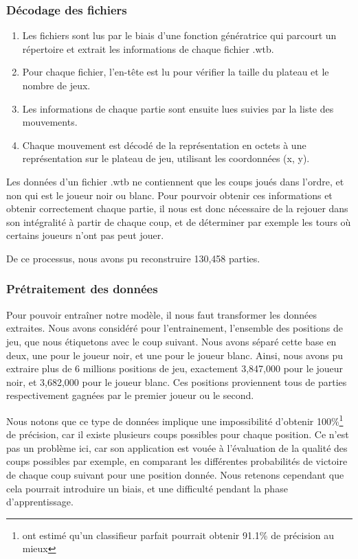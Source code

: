 \subsubsection{Décodage des fichiers}
\begin{enumerate}
    \item Les fichiers sont lus par le biais d'une fonction génératrice qui parcourt un répertoire et extrait les informations de chaque fichier .wtb.
    \item Pour chaque fichier, l'en-tête est lu pour vérifier la taille du plateau et le nombre de jeux.
    \item Les informations de chaque partie sont ensuite lues suivies par la liste des mouvements.
    \item Chaque mouvement est décodé de la représentation en octets à une représentation sur le plateau de jeu, utilisant les coordonnées (x, y).
\end{enumerate}

Les données d'un fichier .wtb ne contiennent que les coups joués dans l'ordre, et non qui est le joueur noir ou blanc. Pour pourvoir obtenir ces informations et obtenir correctement chaque partie, il nous est donc nécessaire de la rejouer dans son intégralité à partir de chaque coup, et de déterminer par exemple les tours où certains joueurs n'ont pas peut jouer.

De ce processus, nous avons pu reconstruire 130,458 parties.

\subsubsection{Prétraitement des données}
\label{subsubsec:preproc}
Pour pouvoir entraîner notre modèle, il nous faut transformer les données extraites. Nous avons considéré pour l'entrainement, l'ensemble des positions de jeu, que nous étiquetons avec le coup suivant. Nous avons séparé cette base en deux, une pour le joueur noir, et une pour le joueur blanc. Ainsi, nous avons pu extraire plus de 6 millions positions de jeu, exactement 3,847,000 pour le joueur noir, et 3,682,000 pour le joueur blanc. Ces positions proviennent tous de parties respectivement gagnées par le premier joueur ou le second. 

Nous notons que ce type de données implique une impossibilité d'obtenir 100\%\footnote{\cite{Liskowski_2018} ont estimé qu'un classifieur parfait pourrait obtenir 91.1\% de précision au mieux} de précision, car il existe plusieurs coups possibles pour chaque position. Ce n'est pas un problème ici, car son application est vouée à l'évaluation de la qualité des coups possibles par exemple, en comparant les différentes probabilités de victoire de chaque coup suivant pour une position donnée. Nous retenons cependant que cela pourrait introduire un biais, et une difficulté pendant la phase d'apprentissage.

